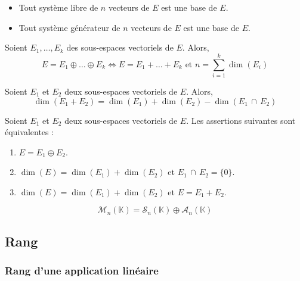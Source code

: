   \begin{proposition}
    \begin{itemize}
      \item Tout système libre de $n$ vecteurs de $E$ est une base de $E$.
      \item Tout système générateur de $n$ vecteurs de $E$ est une base de $E$.
    \end{itemize}
  \end{proposition}

  \begin{proposition}
    Soient $E_1, \dots, E_k$ des sous-espaces vectoriels de $E$. Alors,
    \[ E = E_1 \oplus \dots \oplus E_k \iff E = E_1 + \dots + E_k \text{ et } n = \sum_{i=1}^{k} \dim(E_i) \]
  \end{proposition}

  \begin{proposition}
    Soient $E_1$ et $E_2$ deux sous-espaces vectoriels de $E$. Alors,
    \[ \dim(E_1 + E_2) = \dim(E_1) + \dim(E_2) - \dim(E_1 \, \cap \, E_2) \]
  \end{proposition}

  \begin{corollary}
    Soient $E_1$ et $E_2$ deux sous-espaces vectoriels de $E$. Les assertions suivantes sont équivalentes :
    \begin{enumerate}[label=(\roman*)]
      \item $E = E_1 \oplus E_2$.
      \item $\dim(E) = \dim(E_1) + \dim(E_2)$ et $E_1 \, \cap \, E_2 = \{ 0 \}$.
      \item $\dim(E) = \dim(E_1) + \dim(E_2)$ et $E = E_1 + E_2$.
    \end{enumerate}
  \end{corollary}


  \begin{example}
    \[ \mathcal{M}_n(\mathbb{K}) = \mathcal{S}_n(\mathbb{K}) \oplus \mathcal{A}_n(\mathbb{K}) \]
  \end{example}

  \subsection{Rang}

  \subsubsection{Rang d'une application linéaire}

